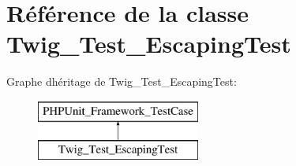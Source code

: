 \hypertarget{class_twig___test___escaping_test}{}\section{Référence de la classe Twig\+\_\+\+Test\+\_\+\+Escaping\+Test}
\label{class_twig___test___escaping_test}
Graphe d\textquotesingle{}héritage de Twig\+\_\+\+Test\+\_\+\+Escaping\+Test\+:\begin{figure}[H]
\begin{center}
\leavevmode
\includegraphics[height=2.000000cm]{class_twig___test___escaping_test}
\end{center}
\end{figure}
